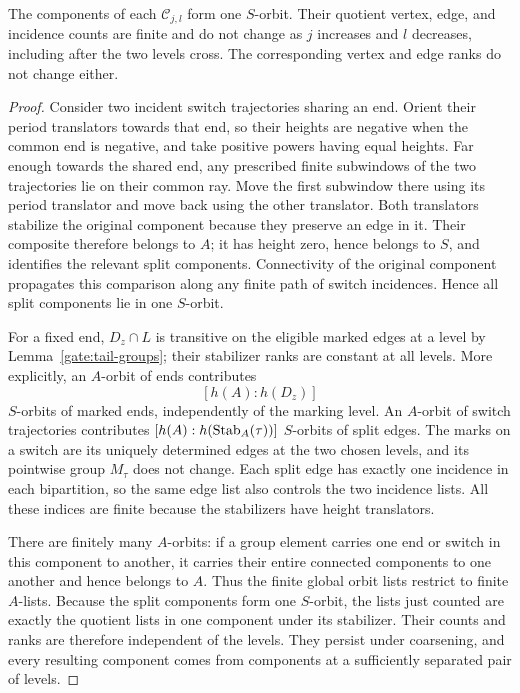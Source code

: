 \begin{lemma}\label{gate:mark-orbits}
The components of each $\mathcal C_{j,l}$ form one $S$-orbit.  Their
quotient vertex, edge, and incidence counts are finite and do not change
as $j$ increases and $l$ decreases, including after the two levels cross.
The corresponding vertex and edge ranks do not change either.
\end{lemma}
\begin{proof}
Consider two incident switch trajectories sharing an end.  Orient their
period translators towards that end, so their heights are negative when
the common end is negative, and take positive powers having equal heights.
Far enough
towards the shared end, any prescribed finite subwindows of the two
trajectories lie on their common ray.  Move the first subwindow there
using its period translator and move back using the other translator.
Both translators stabilize the original component because they preserve
an edge in it.  Their composite therefore belongs to $A$; it has height
zero, hence belongs to $S$, and identifies the relevant split components.
Connectivity of the
original component propagates this comparison along any finite path of
switch incidences.  Hence all split components lie in one $S$-orbit.

For a fixed end, $D_z\cap L$ is transitive on the eligible marked edges
at a level by Lemma~\ref{gate:tail-groups}; their stabilizer ranks are
constant at all levels. More explicitly, an \(A\)-orbit of ends
contributes
\[
 [h(A):h(D_z)]
\]
\(S\)-orbits of marked ends, independently of the marking level.
An \(A\)-orbit of switch trajectories contributes
\( [h(A):h(\operatorname{Stab}_A(\tau))]\) \(S\)-orbits of split edges.
The marks on a switch are its uniquely determined edges at the two
chosen levels, and its pointwise group \(M_\tau\) does not change.
Each split edge has exactly one incidence in each bipartition, so
the same edge list also controls the two incidence lists. All these
indices are finite because the stabilizers have height translators.

There are finitely many \(A\)-orbits: if a group element carries
one end or switch in this component to another, it carries their
entire connected components to one another and hence belongs to
\(A\). Thus the finite global orbit lists restrict to finite
\(A\)-lists. Because the split components form one \(S\)-orbit,
the lists just counted are exactly the quotient lists in one
component under its stabilizer. Their counts and ranks are therefore
independent of the levels.
They persist under coarsening, and every resulting component comes from
components at a sufficiently separated pair of levels.
\end{proof}

